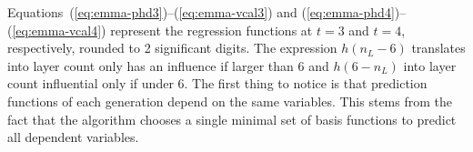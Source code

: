 Equations~(\ref{eq:emma-phd3})--(\ref{eq:emma-vcal3}) and (\ref{eq:emma-phd4})--(\ref{eq:emma-vcal4}) represent the regression functions at $t=3$ and $t=4$, respectively, rounded to 2 significant digits.
The expression $h(n_L-6)$ translates into layer count only has an influence if larger than 6 
and $h(6-n_L)$ into layer count influential only if under 6.
%
The first thing to notice is that prediction functions of each generation depend on the same variables. 
This stems from the fact that the algorithm chooses a single minimal set of basis functions to predict all dependent variables. 
%

